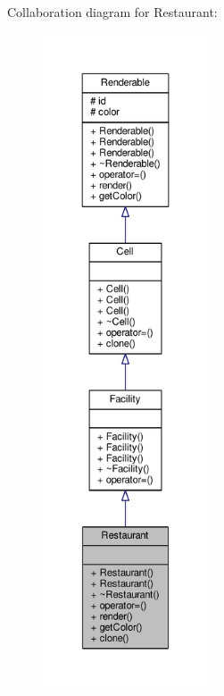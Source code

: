 Collaboration diagram for Restaurant\+:
\nopagebreak
\begin{figure}[H]
\begin{center}
\leavevmode
\includegraphics[height=550pt]{classRestaurant__coll__graph}
\end{center}
\end{figure}
